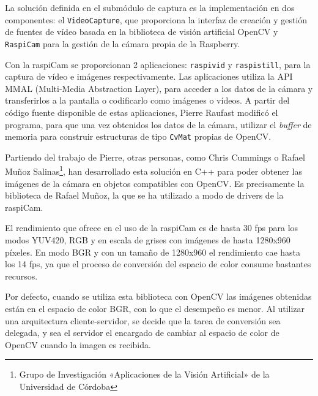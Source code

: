 La solución definida en el submódulo de captura es la implementación en dos componentes: el \texttt{VideoCapture}, que proporciona la interfaz de creación y gestión de fuentes de vídeo basada en la biblioteca de visión artificial OpenCV y \texttt{RaspiCam} para la gestión de la cámara propia de la Raspberry.

Con la raspiCam se proporcionan 2 aplicaciones: \texttt{raspivid} y \texttt{raspistill}, para la captura de vídeo e imágenes respectivamente. Las aplicaciones utiliza la API MMAL (Multi-Media Abstraction Layer), para acceder a los datos de la cámara y transferirlos a la pantalla o codificarlo como imágenes o vídeos. A partir del código fuente disponible de estas aplicaciones, Pierre Raufast modificó el programa, para que una vez obtenidos los datos de la cámara, utilizar el \textit{buffer} de memoria para construir estructuras de tipo \texttt{CvMat} propias de OpenCV.

Partiendo del trabajo de Pierre, otras personas, como Chris Cummings o Rafael Muñoz Salinas\footnote{Grupo de Investigación «Aplicaciones de la Visión Artificial» de la Universidad de Córdoba}, han desarrollado esta solución en C++ para poder obtener las imágenes de la cámara en objetos compatibles con OpenCV. Es precisamente la biblioteca de Rafael Muñoz, la que se ha utilizado a modo de drivers de la raspiCam. 

El rendimiento que ofrece en el uso de la raspiCam es de hasta 30 fps para los modos YUV420, RGB y en escala de grises con imágenes de hasta 1280x960 píxeles. En modo BGR y con un tamaño de 1280x960 el rendimiento cae hasta los 14 fps, ya que el proceso de conversión del espacio de color consume bastantes recursos. 

Por defecto, cuando se utiliza esta biblioteca con OpenCV las imágenes obtenidas están en el espacio de color BGR, con lo que el desempeño es menor. 
Al utilizar una arquitectura cliente-servidor, se decide que la tarea de conversión sea delegada, y sea el servidor el encargado de cambiar al espacio de color de OpenCV cuando la imagen es recibida.

